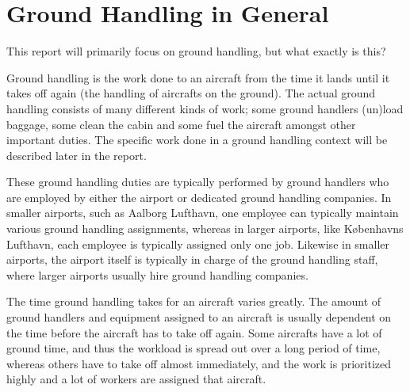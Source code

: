 \section{Ground Handling in General}
This report will primarily focus on ground handling, but what exactly is this?

Ground handling is the work done to an aircraft from the time it lands until it takes off again (the handling of aircrafts on the ground). The actual ground handling consists of many different kinds of work; some ground handlers (un)load baggage, some clean the cabin and some fuel the aircraft amongst other important duties. The specific work done in a ground handling context will be described later in the report.

These ground handling duties are typically performed by ground handlers who are employed by either the airport or dedicated ground handling companies. In smaller airports, such as Aalborg Lufthavn, one employee can typically maintain various ground handling assignments, whereas in larger airports, like Københavns Lufthavn, each employee is typically assigned only one job. Likewise in smaller airports, the airport itself is typically in charge of the ground handling staff, where larger airports usually hire ground handling companies.

The time ground handling takes for an aircraft varies greatly. The amount of ground handlers and equipment assigned to an aircraft is usually dependent on the time before the aircraft has to take off again. Some aircrafts have a lot of ground time, and thus the workload is spread out over a long period of time, whereas others have to take off almost immediately, and the work is prioritized highly and a lot of workers are assigned that aircraft.